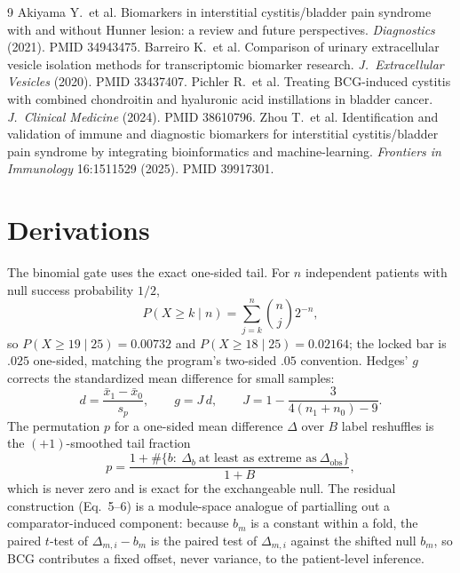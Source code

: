\documentclass[11pt,a4paper]{article}
\begin{document}
\begin{thebibliography}{9}
 Akiyama Y.\ et al. Biomarkers in interstitial
cystitis/bladder pain syndrome with and without Hunner lesion: a review and
future perspectives. \emph{Diagnostics} (2021). PMID 34943475.
 Barreiro K.\ et al. Comparison of urinary
extracellular vesicle isolation methods for transcriptomic biomarker research.
\emph{J.\ Extracellular Vesicles} (2020). PMID 33437407.
 Pichler R.\ et al. Treating BCG-induced cystitis with
combined chondroitin and hyaluronic acid instillations in bladder cancer.
\emph{J.\ Clinical Medicine} (2024). PMID 38610796.
 Zhou T.\ et al. Identification and validation of immune
and diagnostic biomarkers for interstitial cystitis/bladder pain syndrome by
integrating bioinformatics and machine-learning. \emph{Frontiers in
Immunology} 16:1511529 (2025). PMID 39917301.
\end{thebibliography}

\clearpage
\appendix

\section{Derivations}
\label{app:deriv}
The binomial gate uses the exact one-sided tail. For $n$ independent patients
with null success probability $1/2$,
\begin{equation}
P(X\geq k\mid n)=\sum_{j=k}^{n}\binom{n}{j}2^{-n},
\end{equation}
so $P(X\geq19\mid25)=0.00732$ and $P(X\geq18\mid25)=0.02164$; the locked bar is
$.025$ one-sided, matching the program's two-sided $.05$ convention. Hedges'
$g$ corrects the standardized mean difference for small samples:
\begin{equation}
d=\frac{\bar x_1-\bar x_0}{s_p},\qquad
g=J\,d,\qquad J=1-\frac{3}{4(n_1+n_0)-9}.
\end{equation}
The permutation $p$ for a one-sided mean difference $\Delta$ over $B$ label
reshuffles is the $(+1)$-smoothed tail fraction
\begin{equation}
p=\frac{1+\#\{b:\ \Delta_b\ \text{at least as extreme as}\ \Delta_{\mathrm{obs}}\}}{1+B},
\end{equation}
which is never zero and is exact for the exchangeable null. The residual
construction (Eq.~5--6) is a module-space analogue of partialling out a
comparator-induced component: because $b_m$ is a constant within a fold, the
paired $t$-test of $\Delta_{m,i}-b_m$ is the paired test of $\Delta_{m,i}$
against the shifted null $b_m$, so BCG contributes a fixed offset, never
variance, to the patient-level inference.
\end{document}
